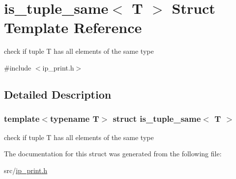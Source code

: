 \hypertarget{structis__tuple__same}{}\section{is\+\_\+tuple\+\_\+same$<$ T $>$ Struct Template Reference}
\label{structis__tuple__same}


check if tuple T has all elements of the same type  




{\ttfamily \#include $<$ip\+\_\+print.\+h$>$}



\subsection{Detailed Description}
\subsubsection*{template$<$typename T$>$\newline
struct is\+\_\+tuple\+\_\+same$<$ T $>$}

check if tuple T has all elements of the same type 

The documentation for this struct was generated from the following file\+:\begin{DoxyCompactItemize}
\item 
src/\hyperlink{ip__print_8h}{ip\+\_\+print.\+h}\end{DoxyCompactItemize}
